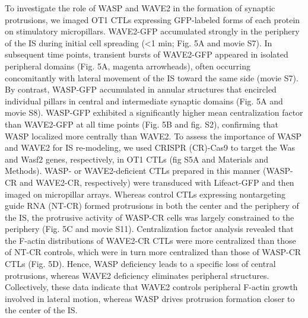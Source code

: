 To investigate the role of WASP and WAVE2 in the formation of synaptic protrusions, we imaged OT1 CTLs expressing GFP-labeled forms of each protein on stimulatory micropillars. WAVE2-GFP accumulated strongly in the periphery of the IS during initial cell spreading (<1 min; Fig. 5A and movie S7). In subsequent time points, transient bursts of WAVE2-GFP appeared in isolated peripheral domains (Fig. 5A, magenta arrowheads), often occurring concomitantly with lateral movement of the IS toward the same side (movie S7). By contrast, WASP-GFP accumulated in annular structures that encircled individual pillars in central and intermediate synaptic domains (Fig. 5A and movie S8). WASP-GFP exhibited a significantly higher mean centralization factor than WAVE2-GFP at all time points (Fig. 5B and fig. S2), confirming that WASP localized more centrally than WAVE2. To assess the importance of WASP and WAVE2 for IS re-modeling, we used CRISPR (CR)-Cas9 to target the Was and Wasf2 genes, respectively, in OT1 CTLs (fig S5A and Materials and Methods). WASP- or WAVE2-deficient CTLs prepared in this manner (WASP-CR and WAVE2-CR, respectively) were transduced with Lifeact-GFP and then imaged on micropillar arrays. Whereas control CTLs expressing nontargeting guide RNA (NT-CR) formed protrusions in both the center and the periphery of the IS, the protrusive activity of WASP-CR cells was largely constrained to the periphery (Fig. 5C and movie S11). Centralization factor analysis revealed that the F-actin distributions of WAVE2-CR CTLs were more centralized than those of NT-CR controls, which were in turn more centralized than those of WASP-CR CTLs (Fig. 5D). Hence, WASP deficiency leads to a specific loss of central protrusions, whereas WAVE2 deficiency eliminates peripheral structures. Collectively, these data indicate that WAVE2 controls peripheral F-actin growth involved in lateral motion, whereas WASP drives protrusion formation closer to the center of the IS.

